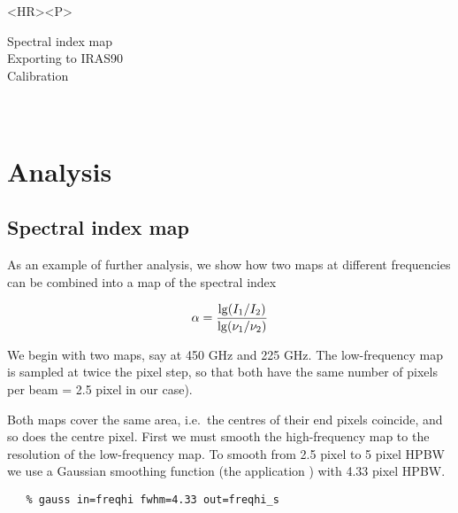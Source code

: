\begin{htmlonly}
\begin{rawhtml} <HR><P> \end{rawhtml}
{\bf {}} Spectral index map\\
{\bf {}} Exporting to IRAS90\\
{\bf {}} Calibration\\
{\bf {}}\\
{\bf {}}\\
\end{htmlonly}


\newpage
\section{Analysis}

\subsection{\label{spindex}Spectral index map}

   As an example of further analysis, we show how two maps at different
   frequencies can be combined into a map of the spectral index

\[\alpha = {\lg(I_1/I_2) \over \lg(\nu_1/\nu_2)}\]

   We begin with two maps, say at 450 GHz and 225 GHz. The low-frequency
   map is sampled at twice the pixel step, so that both have the same
   number of pixels per beam
   = 2.5 pixel in our case).

\begin{latexonly}
\begin{center}
\leavevmode\epsfysize=80mm
\end{center}
\end{latexonly}

   Both maps cover the same area, i.e.\ the centres of their end pixels
   coincide, and so does the centre pixel.
   First we must smooth the high-frequency map to the resolution of the
   low-frequency map. To smooth from 2.5 pixel to 5 pixel HPBW we
   use a Gaussian smoothing function (the application
{\tt {}})
   with 4.33 pixel HPBW.

\begin{verbatim}
   % gauss in=freqhi fwhm=4.33 out=freqhi_s
\end{verbatim}

